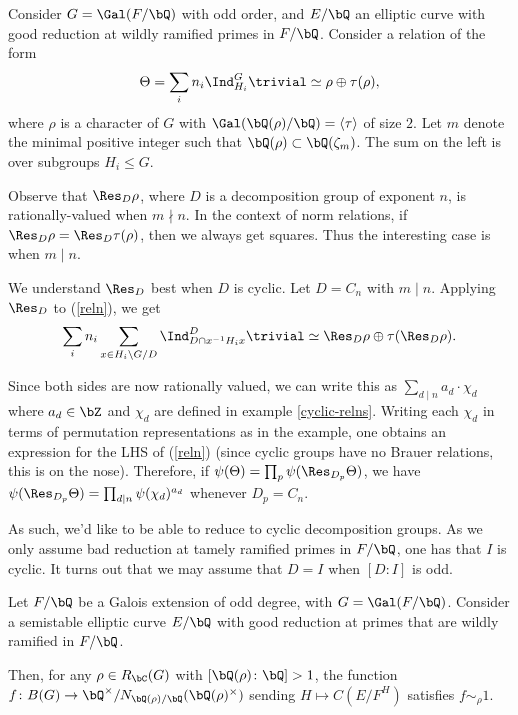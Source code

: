 Consider $G = \Gal(F / \bQ)$ with odd order, and $E / \bQ$ an elliptic curve with good reduction at wildly ramified primes in $F / \bQ$. Consider a relation of the form
\begin{equation}\label{reln} 
    \Theta = \sum_i n_i \Ind_{H_i}^G \trivial \simeq \rho \oplus \tau(\rho),
\end{equation}
where $\rho$ is a character of $G$ with $\Gal(\bQ(\rho) / \bQ) = \langle \tau \rangle $ of size $2$. Let $m$ denote the minimal positive integer such that $\bQ(\rho) \subset \bQ(\zeta_m)$. The sum on the left is over subgroups $H_i \leq G$. 

Observe that $\Res_D\rho$, where $D$ is a decomposition group of exponent $n$, is rationally-valued when $m \nmid n$. In the context of norm relations, if $\Res_D\rho = \Res_D\tau(\rho)$, then we always get squares. Thus the interesting case is when $m \mid n$. 

We understand $\Res_D$ best when $D$ is cyclic. Let $D = C_n$ with $m \mid n$. Applying $\Res_D$ to (\ref{reln}), we get
\begin{equation}\label{reln-resD}
\sum_i n_i \sum_{x \in H_i \backslash G / D} \Ind_{D \cap x^{-1}H_i x}^D \trivial \simeq \Res_D \rho \oplus \tau(\Res_D \rho).
\end{equation}

Since both sides are now rationally valued, we can write this as $\sum_{d \mid n} a_d \cdot \chi_d$ where $a_d \in \bZ$ and $\chi_d$ are defined in example \ref{cyclic-relns}. Writing each $\chi_d$ in terms of permutation representations as in the example, one obtains an expression for the LHS of (\ref{reln}) (since cyclic groups have no Brauer relations, this is on the nose).
Therefore, if $\psi(\Theta) = \prod_p \psi(\Res_{D_p} \Theta)$, we have $\psi(\Res_{D_p} \Theta) = \prod_{d \mid n} \psi(\chi_d)^{a_d}$ whenever $D_p = C_n$.

As such, we'd like to be able to reduce to cyclic decomposition groups. As we only assume bad reduction at tamely ramified primes in $F / \bQ$, one has that $I$ is cyclic. 
It turns out that we may assume that $D = I$ when $[D \colon I]$ is odd. 

\begin{thm}
    Let $F / \bQ$ be a Galois extension of odd degree, with $G = \Gal(F / \bQ)$. 
    Consider a semistable elliptic curve $E / \bQ$ with good reduction at primes that are wildly ramified in $F / \bQ$.
    
    Then, for any $\rho \in R_{\bC}(G)$ with $[\bQ(\rho)\colon \bQ] > 1$, the function $f \colon B(G) \to
    \bQ^{\times} / N_{\bQ(\rho) / \bQ}(\bQ(\rho)^{\times})$ sending $H \mapsto C(E / F^{H})$ satisfies $f \sim_{\rho} 1$.
\end{thm}
